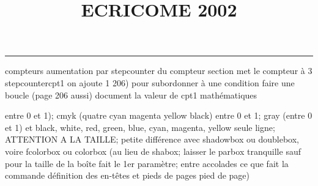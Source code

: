 \documentclass[11pt]{article}%
\title{\bf \vspace{-2cm} ECRICOME 2002} %
\author{} %
\date{} %
\renewcommand{\headrulewidth}{0pt}%
\renewcommand{\footrulewidth}{0.4pt}%
\begin{document}
\maketitle %
\vspace{-1.4cm}\hrule %
\thispagestyle{fancy}

\vspace*{.2cm}



compteurs%
aumentation par stepcounter du compteur section%
met le compteur à 3%
stepcounter{cpt1} on ajoute 1%
206) pour subordonner à une condition %
faire une boucle (page 206 aussi) %
document la valeur de cpt1 
mathématiques\newcommand{\ch}{\operatorname{ch}} 
\newcommand{\sh}{\operatorname{sh}}
\renewcommand{\tanh}{\operatorname{th}}
\renewcommand{\sinh}{\operatorname{sh}}
\renewcommand{\cosh}{\operatorname{ch}}
\newcommand{\argsh}{\operatorname{argsh}}
\newcommand{\argch}{\operatorname{argch}}
\newcommand{\argth}{\operatorname{argth}}
\newcommand{\Id}{\operatorname{Id}}
\renewcommand{\leq}{\leq}
\renewcommand{\geq}{\geq }

entre 0 et 1); cmyk (quatre cyan magenta yellow black) entre 0 et 1;
gray (entre 0 et 1) et black, white, red, green, blue, cyan, magenta,
yellow%
seule ligne; ATTENTION A LA TAILLE; petite différence avec shadowbox ou
doublebox, voire fcolorbox ou colorbox (au lieu de shabox; laisser le
parbox tranquille sauf pour la taille de la boîte
\newcommand{\Tbox}[1]{\begin{center} \shabox{\parbox{0.6
\linewidth}{#1}} \end{center}} %
fait le 1er paramètre; entre accolades ce que fait la commande
définition des en-têtes et pieds de pages\pagestyle{fancy}
\chead{}
\rfoot[ \ \thepage]{\thepage}
\cfoot{}
\lfoot{}
\thispagestyle{fancy} %
pied de page)\renewcommand{\footrulewidth}{0.4pt}
\renewcommand{\headrulewidth}{0.4pt}
\end{document}

